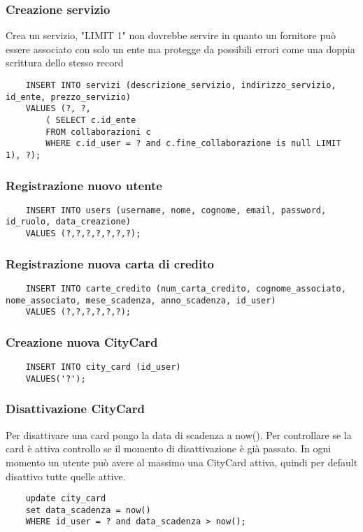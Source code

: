 \subsubsection{Creazione servizio}
Crea un servizio, "LIMIT 1" non dovrebbe servire in quanto un fornitore può essere
associato con solo un ente ma protegge da possibili errori come una doppia scrittura dello stesso record
\begin{lstlisting}
    INSERT INTO servizi (descrizione_servizio, indirizzo_servizio, id_ente, prezzo_servizio) 
    VALUES (?, ?, 
        ( SELECT c.id_ente
        FROM collaborazioni c
        WHERE c.id_user = ? and c.fine_collaborazione is null LIMIT 1), ?);
\end{lstlisting}

\subsubsection{Registrazione nuovo utente}
\begin{lstlisting}
    INSERT INTO users (username, nome, cognome, email, password, id_ruolo, data_creazione) 
    VALUES (?,?,?,?,?,?,?);
\end{lstlisting}

\subsubsection{Registrazione nuova carta di credito}
\begin{lstlisting}
    INSERT INTO carte_credito (num_carta_credito, cognome_associato, nome_associato, mese_scadenza, anno_scadenza, id_user) 
    VALUES (?,?,?,?,?,?);
\end{lstlisting}

\subsubsection{Creazione nuova CityCard}
\begin{lstlisting}
    INSERT INTO city_card (id_user) 
    VALUES('?');
\end{lstlisting}

\subsubsection{Disattivazione CityCard}
Per disattivare una card pongo la data di scadenza a now().
Per controllare se la card è attiva controllo se il momento di disattivazione è già passato.
In ogni momento un utente può avere al massimo una CityCard attiva,
quindi per default disattivo tutte quelle attive.
\begin{lstlisting}
    update city_card
    set data_scadenza = now()
    WHERE id_user = ? and data_scadenza > now();
\end{lstlisting}

